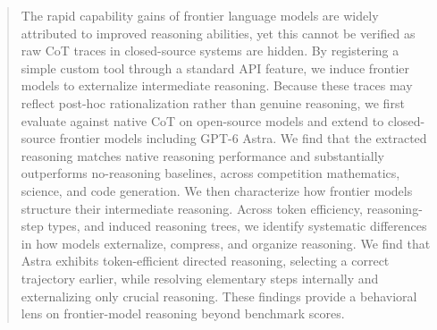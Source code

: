 \documentclass[10pt,letterpaper]{article}
\newcommand{\method}{\textsc{Forced-Reasoning}}
\begin{document}
\begin{abstract}
The rapid capability gains of frontier language models are widely attributed to improved reasoning abilities, yet this cannot be verified as raw CoT traces in closed-source systems are hidden. 
By registering a simple custom tool through a standard API feature, we induce frontier models to externalize intermediate reasoning.
Because these traces may reflect post-hoc rationalization rather than genuine reasoning, we first evaluate against native CoT on open-source models and extend to closed-source frontier models including GPT-6 Astra. 
We find that the extracted reasoning matches native reasoning performance and substantially outperforms no-reasoning baselines, across competition mathematics, science, and code generation.
We then characterize how frontier models structure their intermediate reasoning.
Across token efficiency, reasoning-step types, and induced reasoning trees, we identify systematic differences in how models externalize, compress, and organize reasoning.
We find that Astra exhibits token-efficient directed reasoning, selecting a correct trajectory earlier, while resolving elementary steps internally and externalizing only crucial reasoning. 
These findings provide a behavioral lens on frontier-model reasoning beyond benchmark scores.



\end{abstract}
\end{document}
